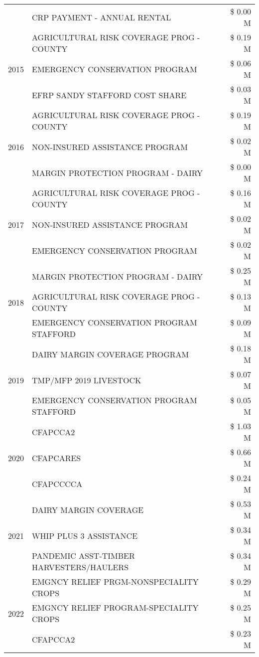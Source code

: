 \begin{tabular}{llr}
 & CRP PAYMENT - ANNUAL RENTAL & \$ 0.00 M \\
\cline{1-3}
\multirow[t]{3}{*}{2015} & AGRICULTURAL RISK COVERAGE PROG - COUNTY & \$ 0.19 M \\
 & EMERGENCY CONSERVATION PROGRAM & \$ 0.06 M \\
 & EFRP SANDY STAFFORD COST SHARE & \$ 0.03 M \\
\cline{1-3}
\multirow[t]{3}{*}{2016} & AGRICULTURAL RISK COVERAGE PROG - COUNTY & \$ 0.19 M \\
 & NON-INSURED ASSISTANCE PROGRAM & \$ 0.02 M \\
 & MARGIN PROTECTION PROGRAM - DAIRY & \$ 0.00 M \\
\cline{1-3}
\multirow[t]{3}{*}{2017} & AGRICULTURAL RISK COVERAGE PROG - COUNTY & \$ 0.16 M \\
 & NON-INSURED ASSISTANCE PROGRAM & \$ 0.02 M \\
 & EMERGENCY CONSERVATION PROGRAM & \$ 0.02 M \\
\cline{1-3}
\multirow[t]{3}{*}{2018} & MARGIN PROTECTION PROGRAM - DAIRY & \$ 0.25 M \\
 & AGRICULTURAL RISK COVERAGE PROG - COUNTY & \$ 0.13 M \\
 & EMERGENCY CONSERVATION PROGRAM STAFFORD & \$ 0.09 M \\
\cline{1-3}
\multirow[t]{3}{*}{2019} & DAIRY MARGIN COVERAGE PROGRAM & \$ 0.18 M \\
 & TMP/MFP 2019 LIVESTOCK & \$ 0.07 M \\
 & EMERGENCY CONSERVATION PROGRAM STAFFORD & \$ 0.05 M \\
\cline{1-3}
\multirow[t]{3}{*}{2020} & CFAPCCA2 & \$ 1.03 M \\
 & CFAPCARES & \$ 0.66 M \\
 & CFAPCCCCA & \$ 0.24 M \\
\cline{1-3}
\multirow[t]{3}{*}{2021} & DAIRY MARGIN COVERAGE & \$ 0.53 M \\
 & WHIP PLUS 3 ASSISTANCE & \$ 0.34 M \\
 & PANDEMIC ASST-TIMBER HARVESTERS/HAULERS & \$ 0.34 M \\
\cline{1-3}
\multirow[t]{3}{*}{2022} & EMGNCY RELIEF PRGM-NONSPECIALITY CROPS & \$ 0.29 M \\
 & EMGNCY RELIEF PROGRAM-SPECIALITY CROPS & \$ 0.25 M \\
 & CFAPCCA2 & \$ 0.23 M \\
\cline{1-3}
\bottomrule
\end{tabular}
